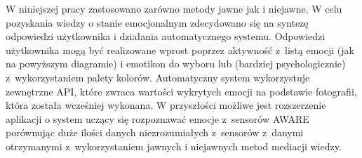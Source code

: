 W niniejszej pracy zastosowano zarówno metody jawne jak i niejawne. W celu pozyskania wiedzy o stanie emocjonalnym zdecydowano się na syntezę odpowiedzi użytkownika i działania automatycznego systemu. Odpowiedzi użytkownika mogą być realizowane wprost poprzez aktywność z~listą emocji (jak na powyższym diagramie) i emotikon do wyboru lub (bardziej psychologicznie) z~wykorzystaniem palety kolorów. Automatyczny system wykorzystuje zewnętrzne API, które zwraca wartości wykrytych emocji na podstawie fotografii, która została wcześniej wykonana. W przyszłości możliwe jest rozszerzenie aplikacji o system uczący się rozpoznawać emocje z~sensorów AWARE porównując duże ilości danych niezrozumiałych z~sensorów z~danymi otrzymanymi z~wykorzystaniem jawnych i niejawnych metod mediacji wiedzy.
